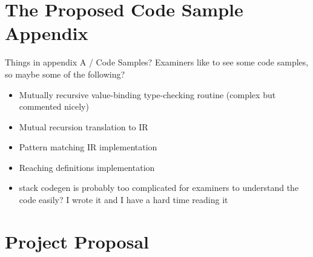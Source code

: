 \documentclass[12pt,notitlepage]{report}
\begin{document}

\clearpage


\clearpage


\clearpage


\clearpage


\clearpage


\printbibliography[title={Bibliography}]
\clearpage

\appendix

\chapter{The Proposed Code Sample Appendix}

Things in appendix A / Code Samples? Examiners like to see some code samples, so maybe some of the following?
\begin{itemize}
	\item Mutually recursive value-binding type-checking routine (complex but commented nicely)
	\item Mutual recursion translation to IR
	\item Pattern matching IR implementation
	\item Reaching definitions implementation
	\item stack codegen is probably too complicated for examiners to understand the code easily? I wrote it and I have a hard time reading it
\end{itemize}


\clearpage


\clearpage


\clearpage

\chapter{Project Proposal}
\clearpage


\end{document}
